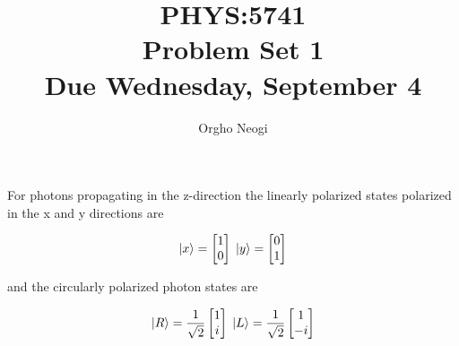 \documentclass[12pt, oneside]{article}
\title{PHYS:5741 \\Problem Set 1 \\Due Wednesday, September 4}
\author{Orgho Neogi}
\date{}
\begin{document}
\maketitle

For photons propagating in the z-direction the linearly polarized states polarized in the x and y directions are

\begin{align*}
  \ket{x} = \begin{bmatrix}1 \\  0\end{bmatrix} \; \ket{y} = \begin{bmatrix}0 \\  1\end{bmatrix}
\end{align*}

\noindent and the circularly polarized photon states are

\begin{align*}
  \ket{R} = \frac{1}{\sqrt{2}}\begin{bmatrix}1 \\  i\end{bmatrix} \; \ket{L} = \frac{1}{\sqrt{2}}\begin{bmatrix}1 \\  -i\end{bmatrix}
\end{align*}
\end{document}
